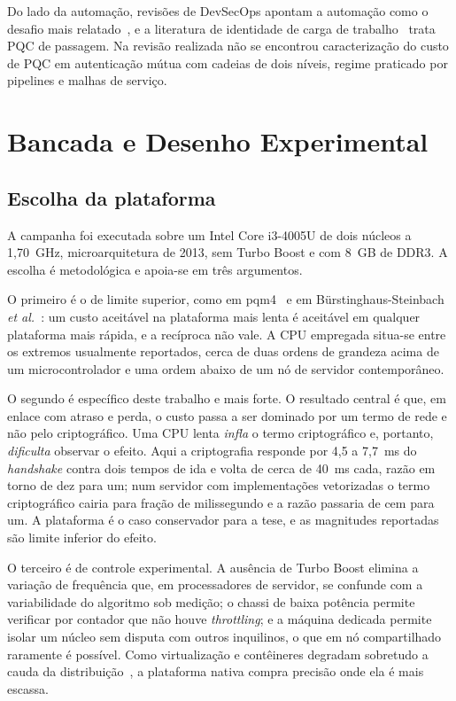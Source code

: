 \documentclass[conference]{IEEEtran}
\begin{document}
Do lado da automação, revisões de DevSecOps apontam a automação como o desafio
mais relatado~\cite{rajapakse2022challenges}, e a literatura de identidade de
carga de trabalho~\cite{avirneni2025workload} trata PQC de passagem. Na revisão
realizada não se encontrou caracterização do custo de PQC em autenticação mútua
com cadeias de dois níveis, regime praticado por pipelines e malhas de serviço.

\section{Bancada e Desenho Experimental}
\label{sec:bancada}

\subsection{Escolha da plataforma}
\label{sec:plataforma}

A campanha foi executada sobre um Intel Core i3-4005U de dois núcleos a 1,70~GHz,
microarquitetura de 2013, sem Turbo Boost e com 8~GB de DDR3. A escolha é
metodológica e apoia-se em três argumentos.

O primeiro é o de limite superior, como em pqm4~\cite{kannwischer2019pqm4} e em
Bürstinghaus-Steinbach \textit{et al.}~\cite{burstinghaus2020embedded}: um custo
aceitável na plataforma mais lenta é aceitável em qualquer plataforma mais
rápida, e a recíproca não vale. A CPU empregada situa-se entre os extremos
usualmente reportados, cerca de duas ordens de grandeza acima de um
microcontrolador e uma ordem abaixo de um nó de servidor contemporâneo.

O segundo é específico deste trabalho e mais forte. O resultado central é que, em
enlace com atraso e perda, o custo passa a ser dominado por um termo de rede e
não pelo criptográfico. Uma CPU lenta \emph{infla} o termo criptográfico e,
portanto, \emph{dificulta} observar o efeito. Aqui a criptografia responde por
4,5 a 7,7~ms do \textit{handshake} contra dois tempos de ida e volta de cerca de
40~ms cada, razão em torno de dez para um; num servidor com implementações
vetorizadas o termo criptográfico cairia para fração de milissegundo e a razão
passaria de cem para um. A plataforma é o caso conservador para a tese, e as
magnitudes reportadas são limite inferior do efeito.

O terceiro é de controle experimental. A ausência de Turbo Boost elimina a
variação de frequência que, em processadores de servidor, se confunde com a
variabilidade do algoritmo sob medição; o chassi de baixa potência permite
verificar por contador que não houve \textit{throttling}; e a máquina dedicada
permite isolar um núcleo sem disputa com outros inquilinos, o que em nó
compartilhado raramente é possível. Como virtualização e contêineres degradam
sobretudo a cauda da distribuição~\cite{felter2015updated}, a plataforma nativa
compra precisão onde ela é mais escassa.
\end{document}
